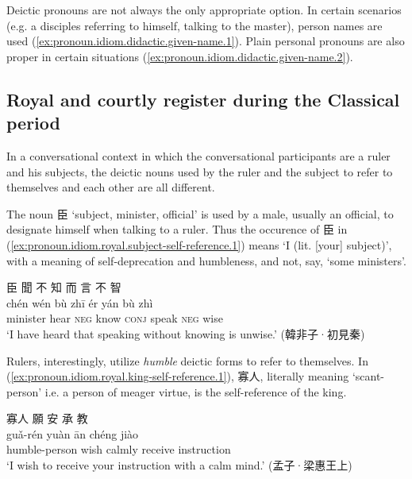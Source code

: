 \documentclass[UTF8, a4paper, oneside, scheme=plain, 12pt]{ctexrep}
\newcommand{\translate}[1]{`#1'}
\newcommand*{\category}[1]{\textsc{#1}}
\begin{document}
Deictic pronouns are not always the only appropriate option.
In certain scenarios (e.g. a disciples referring to himself, talking to the master),
person names are used (\ref{ex:pronoun.idiom.didactic.given-name.1}).
Plain personal pronouns are also proper in certain situations (\ref{ex:pronoun.idiom.didactic.given-name.2}).

\subsection{Royal and courtly register during the Classical period}

In a conversational context in which the conversational participants are a ruler and his subjects, 
the deictic nouns used by the ruler and the subject to refer to themselves and each other are all different.

The noun 臣 \translate{subject, minister, official} is used by a male, usually an official, to designate himself when talking to a ruler.
Thus the occurence of 臣 in (\ref{ex:pronoun.idiom.royal.subject-self-reference.1})
means \translate{I (lit. [your] subject)},
with a meaning of self-deprecation and humbleness, and not, say, \translate{some ministers}.

\begin{exe}
    \ex\label{ex:pronoun.idiom.royal.subject-self-reference.1}
    \glll 臣 聞 不 知 而 言 不 智 \\
    chén wén bù zhī ér yán bù zhì \\
    minister hear \category{neg} know \category{conj} speak \category{neg} wise \\
    \glt\translate{I have heard that speaking without knowing is unwise.} \hfill (韓非子·初見秦)
\end{exe}

Rulers, interestingly, utilize \emph{humble} deictic forms to refer to themselves.
In (\ref{ex:pronoun.idiom.royal.king-self-reference.1}), 寡人, literally meaning \translate{scant-person} i.e. a person of meager virtue, is the self-reference of the king.

\begin{exe}
    \ex\label{ex:pronoun.idiom.royal.king-self-reference.1}
    \glll 寡人 願 安 承 教 \\
    guǎ-rén yuàn ān chéng jiào \\
    humble-person wish calmly receive instruction \\
    \glt\translate{I wish to receive your instruction with a calm mind.} \hfill (孟子·梁惠王上)
\end{exe}
\end{document}
